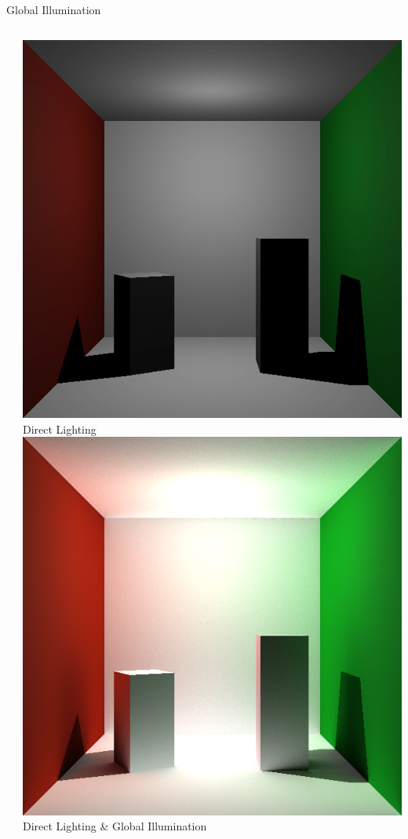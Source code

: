 \documentclass[10pt,handout,compress,professionalfont]{beamer}
\begin{document}
\begin{frame}{Global Illumination}
\begin{columns}
\begin{column}{0.65\textwidth}
        \end{column}
        \begin{column}{0.35\textwidth}
            \vspace{-8mm}
            \includegraphics[width=\textwidth]{../img/boxes_noindirect}\\
            {\centering\scriptsize Direct Lighting\\}
            \vspace{2mm}
            \includegraphics[width=\textwidth]{../img/indirect_box_high}\\
            {\centering\scriptsize Direct Lighting \& Global Illumination\\}
        \end{column}
    \end{columns}


\end{frame}
\end{document}
